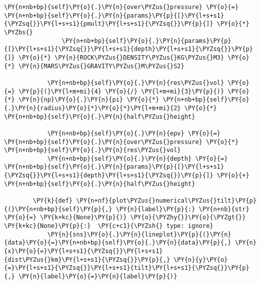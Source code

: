 \begin{tcolorbox}[breakable, size=fbox, boxrule=1pt, pad at break*=1mm,colback=cellbackground, colframe=cellborder]
\begin{Verbatim}[commandchars=\\\{\}]
            \PY{n+nb+bp}{self}\PY{o}{.}\PY{n}{over\PYZus{}pressure} \PY{o}{=} \PY{n+nb+bp}{self}\PY{o}{.}\PY{n}{params}\PY{p}{[}\PY{l+s+s1}{\PYZsq{}}\PY{l+s+s1}{pmult}\PY{l+s+s1}{\PYZsq{}}\PY{p}{]} \PY{o}{*} \PYZbs{}
                \PY{n+nb+bp}{self}\PY{o}{.}\PY{n}{params}\PY{p}{[}\PY{l+s+s1}{\PYZsq{}}\PY{l+s+s1}{depth}\PY{l+s+s1}{\PYZsq{}}\PY{p}{]} \PY{o}{*} \PY{n}{ROCK\PYZus{}DENSITY\PYZus{}KG\PYZus{}M3} \PY{o}{*} \PY{n}{MARS\PYZus{}GRAVITY\PYZus{}M\PYZus{}S2}
    
            \PY{n+nb+bp}{self}\PY{o}{.}\PY{n}{res\PYZus{}vol} \PY{o}{=} \PY{p}{(}\PY{l+m+mi}{4} \PY{o}{/} \PY{l+m+mi}{3}\PY{p}{)} \PY{o}{*} \PY{n}{np}\PY{o}{.}\PY{n}{pi} \PY{o}{*} \PY{n+nb+bp}{self}\PY{o}{.}\PY{n}{radius}\PY{o}{*}\PY{o}{*}\PY{l+m+mi}{2} \PY{o}{*} \PY{n+nb+bp}{self}\PY{o}{.}\PY{n}{half\PYZus{}height}
    
            \PY{n+nb+bp}{self}\PY{o}{.}\PY{n}{epv} \PY{o}{=} \PY{n+nb+bp}{self}\PY{o}{.}\PY{n}{over\PYZus{}pressure} \PY{o}{*} \PY{n+nb+bp}{self}\PY{o}{.}\PY{n}{res\PYZus{}vol}
            \PY{n+nb+bp}{self}\PY{o}{.}\PY{n}{depth} \PY{o}{=} \PY{n+nb+bp}{self}\PY{o}{.}\PY{n}{params}\PY{p}{[}\PY{l+s+s1}{\PYZsq{}}\PY{l+s+s1}{depth}\PY{l+s+s1}{\PYZsq{}}\PY{p}{]} \PY{o}{+} \PY{n+nb+bp}{self}\PY{o}{.}\PY{n}{half\PYZus{}height}
    
        \PY{k}{def} \PY{n+nf}{plot\PYZus{}numerical\PYZus{}tilt}\PY{p}{(}\PY{n+nb+bp}{self}\PY{p}{,} \PY{n}{label}\PY{p}{:} \PY{n+nb}{str} \PY{o}{=} \PY{k+kc}{None}\PY{p}{)} \PY{o}{\PYZhy{}}\PY{o}{\PYZgt{}} \PY{k+kc}{None}\PY{p}{:}  \PY{c+c1}{\PYZsh{} type: ignore}
            \PY{n}{sns}\PY{o}{.}\PY{n}{lineplot}\PY{p}{(}\PY{n}{data}\PY{o}{=}\PY{n+nb+bp}{self}\PY{o}{.}\PY{n}{data}\PY{p}{,} \PY{n}{x}\PY{o}{=}\PY{l+s+s1}{\PYZsq{}}\PY{l+s+s1}{dist\PYZus{}km}\PY{l+s+s1}{\PYZsq{}}\PY{p}{,} \PY{n}{y}\PY{o}{=}\PY{l+s+s1}{\PYZsq{}}\PY{l+s+s1}{tilt}\PY{l+s+s1}{\PYZsq{}}\PY{p}{,} \PY{n}{label}\PY{o}{=}\PY{n}{label}\PY{p}{)}
    

\end{Verbatim}
\end{tcolorbox}
